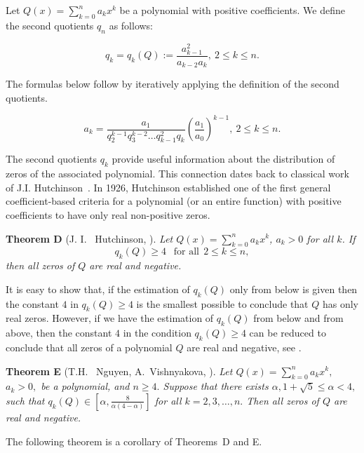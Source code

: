 \documentclass[12pt]{amsart}
\numberwithin{count}{section}
\begin{document}
Let  $Q(x) = \sum_{k=0}^n a_k x^k$  be a polynomial with positive coefficients. 
We define the second quotients  $q_n$ as follows:

\begin{equation}
\label{qqq} 
q_k=q_k(Q):=\frac {a_{k-1}^2}{a_{k-2}a_k},\
2 \leq k \leq n.
\end{equation}

The formulas below follow by iteratively applying the definition of the second quotients.

\begin{equation}
\label{defq}
 a_k=\frac
{a_1}{q_2^{k-1} q_3^{k-2} \ldots q_{k-1}^2 q_k} \left(
\frac{a_1}{a_0} \right) ^{k-1},\    2 \leq k \leq n.
\end{equation}

The second quotients $q_k$ provide useful information about the distribution of zeros 
of the associated polynomial. This connection dates back to classical work of 
J.I. Hutchinson~\cite{hut}. In 1926, Hutchinson established one of the first general 
coefficient-based criteria for a polynomial (or an entire function)  with positive 
coefficients  to have only real non-positive zeros.  

{\bf Theorem D} (J. I. ~Hutchinson, \cite{hut}). { \it Let $Q(x)=
\sum_{k=0}^n a_k x^k$, $a_k > 0$ for all $k$. 
If
$$q_k(Q)\geq 4 \ \ \mbox{ for all} \ \ 2 \leq k \leq n,$$  
then all zeros of $Q$ are real and negative.}

It is easy to show that, if the estimation of $q_k(Q)$ only from below is
given then the constant  $4$  in $q_k (Q) \geq 4$ is the smallest possible to conclude
that $Q$ has only real zeros. However, if we have the estimation of $q_k(Q)$ from below and  
from above, then the constant $4$ in the condition $q_k(Q) \geq 4$ can be reduced to 
conclude that all zeros of a polynomial  $Q$  are real and negative, see  \cite{HishAn}.

{\bf Theorem E} (T.H.~ Nguyen, A.~Vishnyakova,  \cite{HishAn}).
{ \it  Let $Q(x) = \sum_{k=0}^n a_k x^k,$ $a_k > 0,$  be a polynomial, and $n \geq 4.$ Suppose that 
there exists $\alpha,  1 + \sqrt{5} \leq \alpha < 4,$ such that
 $q_k(Q) \in \left[\alpha, \frac{8}{\alpha(4 - \alpha)} \right]$ for all $k =2, 3, \ldots, n.$  
Then  all zeros of $Q$ are real and negative. }

The following theorem is a corollary of Theorems~D and E.
\end{document}
